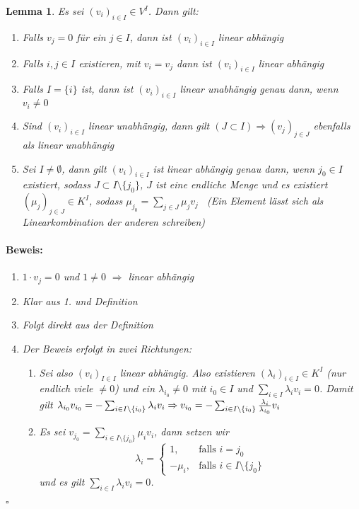 \documentclass{report}
\newcommand{\lb}{\lambda}
\theoremstyle{customrem}
\theoremstyle{customdef}
\newtheorem{lem}[definition]{Lemma}
\renewenvironment{proof}{\vspace{-.75cm}\paragraph{Beweis: }}{\vspace{-.5cm}\hfill$\square$}
\begin{document}
	\begin{lem}
		\label{lem210}
		Es sei $(v_i)_{i \in I} \in V^I$. Dann gilt:
		\begin{enumerate}
			\itemsep.1cm
			\item Falls $v_j = 0$ für ein $j \in I$, dann ist $(v_i)_{i \in I}$ linear abhängig
			\item Falls $i, j \in I$ existieren, mit $v_i = v_j$ dann ist $(v_i)_{i \in I}$ linear abhängig
			\item Falls $I = \{i\}$ ist, dann ist $(v_i)_{i \in I}$ linear unabhängig genau dann, wenn $v_i \neq 0$
			\item Sind $(v_i)_{i \in I}$ linear unabhängig, dann gilt $(J \subset I) \Rightarrow (v_j)_{j \in J}$ ebenfalls als linear unabhängig
			\item Sei $I \neq \emptyset$, dann gilt $(v_i)_{i \in I}$ ist linear abhängig genau dann, wenn $j_0 \in I$ existiert, sodass $J \subset I \setminus \{j_0\}$, $J$ ist eine endliche Menge und es existiert $(\mu_j)_{j \in J} \in K^I$, sodass $\mu_{j_0} = \sum_{j \in J} \mu_j v_j $ \ (Ein Element lässt sich als Linearkombination der anderen schreiben)\\
		\end{enumerate}
		
		\begin{proof}
			\begin{enumerate}
				\itemsep0cm
				\item $1\cdot v_j = 0$ und $1 \neq 0$ $\Rightarrow$ linear abhängig
				\item Klar aus 1. und Definition
				\item Folgt direkt aus der Definition
				\item Der Beweis erfolgt in zwei Richtungen:
				\begin{enumerate}
					\item["`$\Rightarrow$"'] Sei also $(v_i)_{I \in I}$ linear abhängig. Also existieren $(\lb_i)_{i\in I} \in K^I$ (nur endlich viele $\neq 0$) und ein $\lb_{i_0} \neq 0$ mit $i_0 \in I$ und $\sum_{i \in I} \lb_i v_i = 0$.\hspace{1cm} Damit gilt $\lb_{i_0} v_{i_0} = - \sum_{i \in I\setminus\{i_0\}}\lb_i\linebreak v_i	\Rightarrow v_{i_0} = -\sum_{i \in I \setminus \{i_0\}} \frac{\lb_i}{\lb_{i_0}} v_i$
					\item["`$\Leftarrow$"'] 	Es sei $v_{j_0} = \sum_{i \in I \setminus \{j_0\}} \mu_i v_i$, dann setzen wir
					$$\lb_i = \begin{cases}1, & \text{falls } i = j_0\\-\mu_i, & \text{falls } i\in I \setminus \{j_0\}\end{cases}$$
					und es gilt $\sum_{i \in I} \lb_i v_i = 0$.
				\end{enumerate}	
			\end{enumerate}
		\end{proof}
	\end{lem}
\end{document}

